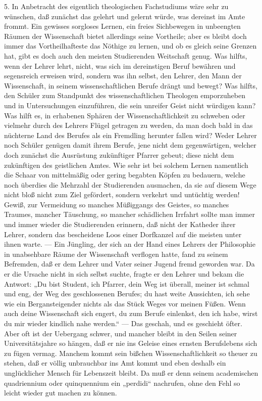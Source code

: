 5. In Anbetracht des eigentlich theologischen Fachstudiums wäre sehr zu wünschen, daß zunächst das gelehrt und gelernt würde, was dereinst im Amte frommt. Ein gewisses sorgloses Lernen, ein freies Sichbewegen in unbeengten Räumen der Wissenschaft bietet allerdings seine Vortheile; aber es bleibt doch immer das Vortheilhafteste das Nöthige zu lernen, und ob es gleich seine Grenzen hat, gibt es doch auch den meisten Studierenden Weitschaft genug. Was hilfts, wenn der Lehrer lehrt, nicht, was sich im dereinstigen Beruf bewähren und segensreich erweisen wird, sondern was ihn selbst, den Lehrer, den Mann der Wissenschaft, in seinem wissenschaftlichen Berufe drängt und bewegt? Was hilfts, den Schüler zum Standpunkt des wissenschaftlichen Theologen emporzuheben und in Untersuchungen einzuführen, die sein unreifer Geist nicht würdigen kann? Was hilft es, in erhabenen Sphären der Wissenschaftlichkeit zu schweben oder vielmehr durch des Lehrers Flügel getragen zu werden, da man doch bald in das nüchterne Land des Berufes als ein Fremdling herunter fallen wird? Weder Lehrer noch Schüler genügen damit ihrem Berufe, jene nicht dem gegenwärtigen, welcher doch zunächst die Ausrüstung zukünftiger Pfarrer
gebeut; diese nicht dem zukünftigen des geistlichen Amtes. Wie sehr ist bei solchem Lernen namentlich die Schaar von mittelmäßig oder gering begabten Köpfen zu bedauern, welche noch überdies die Mehrzahl der Studierenden ausmachen, da sie auf diesem Wege nicht bloß nicht zum Ziel gefördert, sondern verkehrt und untüchtig werden! Gewiß, zur Vermeidung so manches Müßiggangs des Geistes, so manches Traumes, mancher Täuschung, so mancher schädlichen Irrfahrt sollte man immer und immer wieder die Studierenden erinnern, daß nicht der Katheder ihrer Lehrer, sondern das bescheidene Loos einer Dorfkanzel auf die meisten unter ihnen warte. — Ein Jüngling, der sich an der Hand eines Lehrers der Philosophie in unabsehbare Räume der Wissenschaft verflogen hatte, fand zu seinem Befremden, daß er dem Lehrer und Vater seiner Jugend fremd geworden war. Da er die Ursache nicht in sich selbst suchte, fragte er den Lehrer und bekam die Antwort: „Du bist Student, ich Pfarrer, dein Weg ist überall, meiner ist schmal und eng, der Weg des geschlossenen Berufes; du hast weite Aussichten, ich sehe wie ein Bergansteigender nichts als das Stück Weges vor meinen Füßen. Wenn auch deine Wissenschaft sich engert, du zum Berufe einlenkst, den ich habe, wirst du mir wieder kindlich nahe werden.“ — Das geschah, und es geschieht öfter. Aber oft ist der Uebergang schwer, und mancher bleibt in den Seilen seiner Universitätsjahre so hängen, daß er nie ins Geleise eines ernsten Berufslebens sich zu fügen vermag. Manchem kommt sein bißchen Wissenschaftlichkeit so theuer zu stehen, daß er völlig unbrauchbar ins Amt kommt und
eben deshalb ein unglücklicher Mensch für Lebenszeit bleibt. Da muß er denn seinem academischen quadriennium oder quinquennium ein „perdidi“ nachrufen, ohne den Fehl so leicht wieder gut machen zu können.

